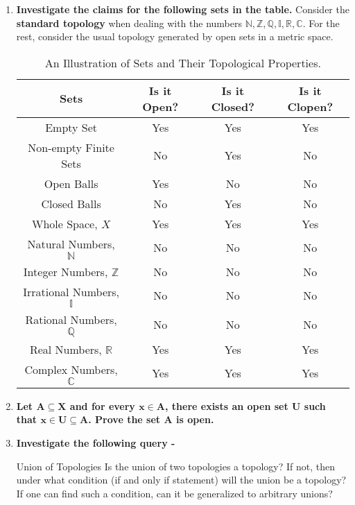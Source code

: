 \begin{enumerate}[label=\textbf{\arabic*.}]
    \item \textbf{Investigate the claims for the following sets in the table.} Consider the \textbf{standard topology} when dealing with the numbers $\mathbb{N, Z, Q, I, R, C}$. For the rest, consider the usual topology generated by open sets in a metric space.
    \begin{table}[H]
        \centering
        \begin{tabular}{|c|c|c|c|}
        \hline
        \textbf{Sets} & \textbf{Is it Open?} & \textbf{Is it Closed?} & \textbf{Is it Clopen?} \\ \hline
        Empty Set & Yes & Yes & Yes \\ \hline
        Non-empty Finite Sets & No & Yes & No \\ \hline
        Open Balls & Yes & No & No \\ \hline
        Closed Balls & No & Yes & No \\ \hline
        Whole Space, $X$ & Yes & Yes & Yes \\ \hline
        Natural Numbers, $\mathbb{N}$ & No & No & No\\ \hline
        Integer Numbers, $\mathbb{Z}$ & No & No & No \\ \hline
        Irrational Numbers, $\mathbb{I}$ & No & No & No \\ \hline
        Rational Numbers, $\mathbb{Q}$ & No & No & No\\ \hline
        Real Numbers, $\mathbb{R}$ & Yes & Yes & Yes \\ \hline
        Complex Numbers, $\mathbb{C}$ & Yes & Yes & Yes \\ \hline
        \end{tabular}
        \caption{An Illustration of Sets and Their Topological Properties.}
        \label{tab:open_closed_table}
    \end{table}
    \item \textbf{Let $\pmb{A\subseteq X}$ and for every $\pmb{x\in A}$, there exists an open set $\pmb{U}$ such that $\pmb{x\in U\subseteq A}$. Prove the set $\pmb{A}$ is open.}
    \item \textbf{Investigate the following query -}
    \begin{Query}{Union of Topologies}\label{union_topology}
        Is the union of two topologies a topology? If not, then under what condition (if and only if statement) will the union be a topology? If one can find such a condition, can it be generalized to arbitrary unions?\\

\end{Query}
\end{enumerate}
